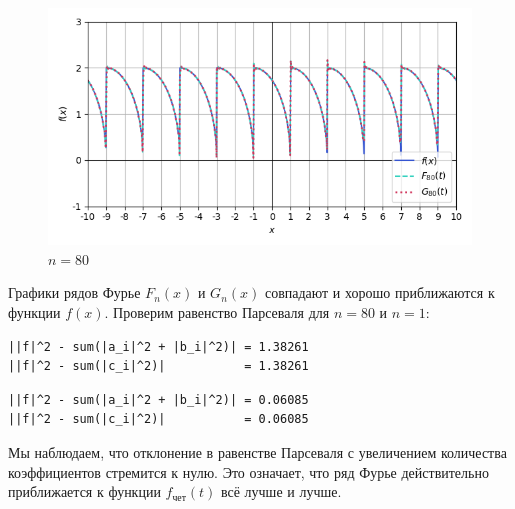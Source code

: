 \documentclass[a4paper]{article}
\begin{document}
\begin{figure}[H]
    \centering
    \includegraphics[width=0.7\linewidth]{per/Im80.png}
    \caption{$n = 80$}
\end{figure}

Графики рядов Фурье $F_n(x)$ и $G_n(x)$ совпадают и хорошо приближаются к функции $f(x)$.
Проверим равенство Парсеваля для $n = 80$ и $n = 1$:

\begin{minipage}{0.48\textwidth}
\begin{lstlisting}[caption={Равенство Парсеваля при $n=1$}]
||f|^2 - sum(|a_i|^2 + |b_i|^2)| = 1.38261
||f|^2 - sum(|c_i|^2)|           = 1.38261
\end{lstlisting}
\end{minipage}\hfill
\begin{minipage}{0.48\textwidth}
\begin{lstlisting}[caption={Равенство Парсеваля при $n=80$}, numbers=none]
||f|^2 - sum(|a_i|^2 + |b_i|^2)| = 0.06085
||f|^2 - sum(|c_i|^2)|           = 0.06085
\end{lstlisting}
\end{minipage}
Мы наблюдаем, что отклонение в равенстве Парсеваля с увеличением количества коэффициентов стремится к нулю. Это означает, что ряд Фурье действительно приближается к функции $f_\text{чет}(t)$ всё лучше и лучше.
\end{document}
